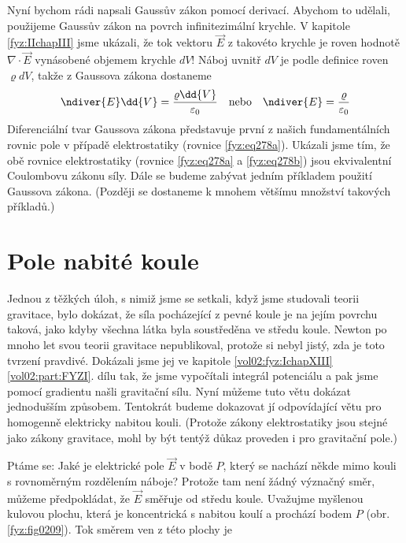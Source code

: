    Nyní bychom rádi napsali Gaussův zákon pomocí derivací. Abychom to udělali, použijeme Gaussův 
    zákon na povrch infinitezimální krychle. V kapitole \ref{fyz:IIchapIII} jsme ukázali, 
    že tok vektoru \(\vec{E}\) z takovéto krychle je roven hodnotě \(\nabla\cdot\vec{E}\) 
    vynásobené objemem krychle \(dV\)! Náboj uvnitř \(dV\) je podle definice roven \(\varrho dV\), 
    takže z Gaussova zákona dostaneme
    \begin{equation}\label{fyz:fey_eq_elstat38}
     \ndiver{E}\dd{V} = \frac{\varrho\dd{V}}{\varepsilon_0} \quad 
     \text{nebo} \quad
     \ndiver{E}       = \frac{\varrho}{\varepsilon_0}
    \end{equation}
    Diferenciální tvar Gaussova zákona představuje první z našich fundamentálních rovnic pole v 
    případě elektrostatiky (rovnice \ref{fyz:eq278a}). Ukázali jsme tím, že obě rovnice 
    elektrostatiky (rovnice \ref{fyz:eq278a} a \ref{fyz:eq278b}) jsou 
    ekvivalentní Coulombovu zákonu síly. Dále se budeme zabývat jedním příkladem použití Gaussova 
    zákona. (Později se dostaneme k mnohem většímu množství takových příkladů.)
    
  \section{Pole nabité koule}\label{fyz:IIchapIVsecVII}
    Jednou z těžkých úloh, s nimiž jsme se setkali, když jsme studovali teorii gravitace, bylo
    dokázat, že síla pocházející z pevné koule je na jejím povrchu taková, jako kdyby všechna látka
    byla soustředěna ve středu koule. Newton po mnoho let svou teorii gravitace nepublikoval,
    protože si nebyl jistý, zda je toto tvrzení pravdivé. Dokázali jsme jej ve kapitole
    \ref{vol02:fyz:IchapXIII} \ref{vol02:part:FYZI}. dílu tak, že jsme vypočítali integrál potenciálu a
    pak jsme pomocí gradientu našli gravitační sílu. Nyní můžeme tuto větu dokázat jednodušším
    způsobem. Tentokrát budeme dokazovat jí odpovídající větu pro homogenně elektricky nabitou
    kouli. (Protože zákony elektrostatiky jsou stejné jako zákony gravitace, mohl by být tentýž
    důkaz proveden i pro gravitační pole.) \cite[s.~77]{Feynman02}
    
    Ptáme se: Jaké je elektrické pole \(\vec{E}\) v bodě \(P\), který se nachází někde mimo kouli s 
    rovnoměrným rozdělením náboje? Protože tam není žádný význačný směr, můžeme předpokládat, že 
    \(\vec{E}\) směřuje od středu koule. Uvažujme myšlenou kulovou plochu, která je koncentrická s 
    nabitou koulí a prochází bodem \(P\) (obr. \ref{fyz:fig0209}). Tok směrem ven z 
    této plochy je


